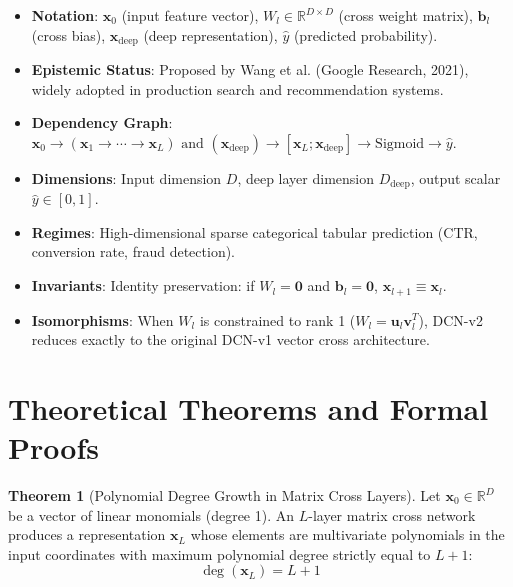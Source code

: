 \documentclass[11pt,a4paper]{article}
\theoremstyle{definition}
\newtheorem{theorem}{\textbf{Theorem}}[section]
\begin{document}
\begin{itemize}
    \item \textbf{Notation}: $\mathbf{x}_0$ (input feature vector), $W_l \in \mathbb{R}^{D \times D}$ (cross weight matrix), $\mathbf{b}_l$ (cross bias), $\mathbf{x}_{\text{deep}}$ (deep representation), $\widehat{y}$ (predicted probability).
    \item \textbf{Epistemic Status}: Proposed by Wang et al. (Google Research, 2021), widely adopted in production search and recommendation systems.
    \item \textbf{Dependency Graph}: $\mathbf{x}_0 \to (\mathbf{x}_1 \to \cdots \to \mathbf{x}_L) \text{ and } (\mathbf{x}_{\text{deep}}) \to [\mathbf{x}_L; \mathbf{x}_{\text{deep}}] \to \text{Sigmoid} \to \widehat{y}$.
    \item \textbf{Dimensions}: Input dimension $D$, deep layer dimension $D_{\text{deep}}$, output scalar $\widehat{y} \in [0, 1]$.
    \item \textbf{Regimes}: High-dimensional sparse categorical tabular prediction (CTR, conversion rate, fraud detection).
    \item \textbf{Invariants}: Identity preservation: if $W_l = \mathbf{0}$ and $\mathbf{b}_l = \mathbf{0}$, $\mathbf{x}_{l+1} \equiv \mathbf{x}_l$.
    \item \textbf{Isomorphisms}: When $W_l$ is constrained to rank 1 ($W_l = \mathbf{u}_l \mathbf{v}_l^T$), DCN-v2 reduces exactly to the original DCN-v1 vector cross architecture.
\end{itemize}

\section{Theoretical Theorems and Formal Proofs}

\begin{theorem}[Polynomial Degree Growth in Matrix Cross Layers]
Let $\mathbf{x}_0 \in \mathbb{R}^D$ be a vector of linear monomials (degree 1). An $L$-layer matrix cross network produces a representation $\mathbf{x}_L$ whose elements are multivariate polynomials in the input coordinates with maximum polynomial degree strictly equal to $L + 1$:
{\boldmath
\begin{equation}
\operatorname{deg}(\mathbf{x}_L) = L + 1
\end{equation}
}
\end{theorem}
\end{document}
